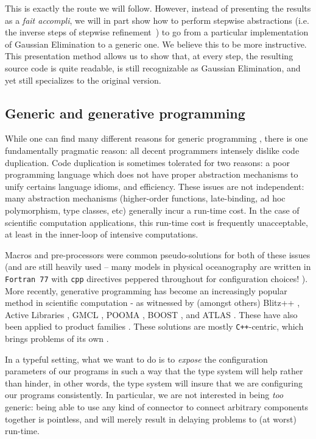 \documentclass[11pt]{elsart}
\begin{document}
This is exactly the route we will follow.  However, instead of presenting
the results as a {\it fait accompli}, we will in part show how to 
perform stepwise abstractions (i.e. the inverse steps of stepwise 
refinement~\cite{journals/CACM/Wirth71})
to go from a particular implementation of Gaussian Elimination to a 
generic one.  We believe this to be more instructive.  This presentation
method allows us
to show that, at every step, the resulting source code is quite readable, 
is still
recognizable as Gaussian Elimination, and yet still specializes to the 
original version.

\subsection{Generic and generative programming}

While one can find many different reasons for generic programming
\cite{musser89generic,musser94algorithmoriented,conf/ac/2003gp}, there is one 
fundamentally pragmatic reason:
all decent programmers intensely dislike code duplication.  Code
duplication is sometimes tolerated for two reasons: a poor programming
language which does not have proper abstraction mechanisms to unify
certains language idioms, and efficiency.  These issues are not 
independent: many
abstraction mechanisms (higher-order functions, late-binding, 
ad hoc polymorphism, type classes, etc)
generally incur a run-time cost.  In the case of scientific computation
applications, this run-time cost is frequently unacceptable, at least
in the inner-loop of intensive computations.

Macros and pre-processors were common pseudo-solutions for both of these issues
(and are still heavily used -- many models in physical oceanography are written
in \texttt{Fortran 77} with \texttt{cpp} directives peppered throughout for
configuration choices! \cite{SPOM}).  More recently, generative programming
\cite{Czarnecki} has become an increasingly popular method in scientific
computation - as witnessed by (amongst others) 
Blitz++ \cite{Veldhuizen:1998:ISCOPE}, 
Active Libraries \cite{Veldhuizen:1998:OO98},
GMCL \cite{Czarnecki},
POOMA \cite{POOMA},
BOOST \cite{BOOST},
and ATLAS \cite{ATLAS}.  These have also been applied to product families
\cite{GenerativeProductLines}.  These solutions are mostly
\verb=C++=-centric, which brings problems of its own
\cite{conf/dagstuhl/CzarneckiOST03}.

In a typeful setting, what we want to do is to \emph{expose} the 
configuration parameters of our programs in such a way that the type system
will help rather than hinder, in other words, the type system will 
insure that we are configuring our programs consistently.  In particular, 
we are not interested in being \emph{too} generic: being able to 
use any kind of connector to connect arbitrary components together is
pointless, and will merely result in delaying problems to (at worst)
run-time.
\end{document}
